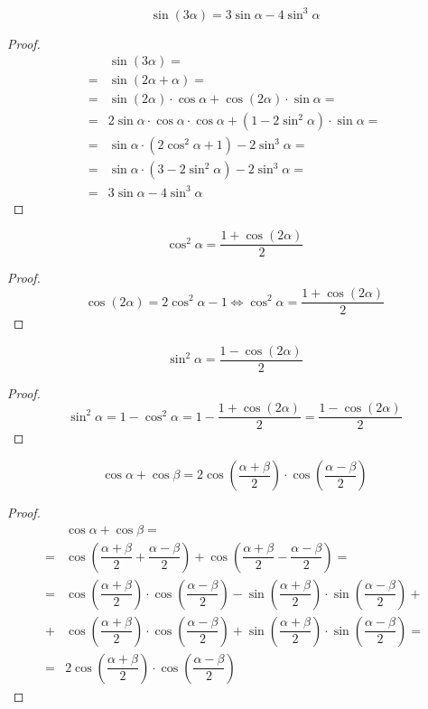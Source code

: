 \documentclass[12pt]{article}
\begin{document}
    \begin{statement}
        $$\sin(3\alpha)=3\sin\alpha-4\sin^3\alpha$$
    \end{statement}
    \begin{proof}
        \begin{align*}
            &\sin(3\alpha)=\\
            =&\sin(2\alpha+\alpha)=\\
            =&\sin(2\alpha)\cdot\cos\alpha+\cos(2\alpha)\cdot\sin\alpha=\\
            =&2\sin\alpha\cdot\cos\alpha\cdot\cos\alpha+(1-2\sin^2\alpha)\cdot\sin\alpha=\\
            =&\sin\alpha\cdot(2\cos^2\alpha+1)-2\sin^3\alpha=\\
            =&\sin\alpha\cdot(3-2\sin^2\alpha)-2\sin^3\alpha=\\
            =&3\sin\alpha-4\sin^3\alpha
        \end{align*}
    \end{proof}
    \begin{statement}
        $$\cos^2\alpha=\dfrac{1+\cos(2\alpha)}{2}$$
    \end{statement}
    \begin{proof}
        $$\cos (2\alpha)=2\cos^2\alpha-1\Longleftrightarrow \cos^2\alpha=\dfrac{1+\cos(2\alpha)}{2}$$
    \end{proof}
    \begin{statement}
        $$\sin^2\alpha=\dfrac{1-\cos(2\alpha)}{2}$$
    \end{statement}
    \begin{proof}
        $$\sin^2\alpha=1-\cos^2\alpha=1-\dfrac{1+\cos(2\alpha)}{2}=\dfrac{1-\cos(2\alpha)}{2}$$
    \end{proof}
    \begin{statement}
        $$\cos\alpha+\cos\beta=2\cos\left(\dfrac{\alpha+\beta}{2}\right)\cdot\cos\left(\dfrac{\alpha-\beta}{2}\right)$$
    \end{statement}
    \begin{proof}
        \begin{align*}
            &\cos\alpha+\cos\beta=\\
            =&\cos\left(\dfrac{\alpha+\beta}{2}+\dfrac{\alpha-\beta}{2}\right)+\cos\left(\dfrac{\alpha+\beta}{2}-\dfrac{\alpha-\beta}{2}\right)=\\
            =&\cos\left(\dfrac{\alpha+\beta}{2}\right)\cdot\cos\left(\dfrac{\alpha-\beta}{2}\right)-\sin\left(\dfrac{\alpha+\beta}{2}\right)\cdot\sin\left(\dfrac{\alpha-\beta}{2}\right)+\\
            +&\cos\left(\dfrac{\alpha+\beta}{2}\right)\cdot\cos\left(\dfrac{\alpha-\beta}{2}\right)+\sin\left(\dfrac{\alpha+\beta}{2}\right)\cdot\sin\left(\dfrac{\alpha-\beta}{2}\right)=\\
            =&2\cos\left(\dfrac{\alpha+\beta}{2}\right)\cdot\cos\left(\dfrac{\alpha-\beta}{2}\right)
        \end{align*}
    \end{proof}
\end{document}
